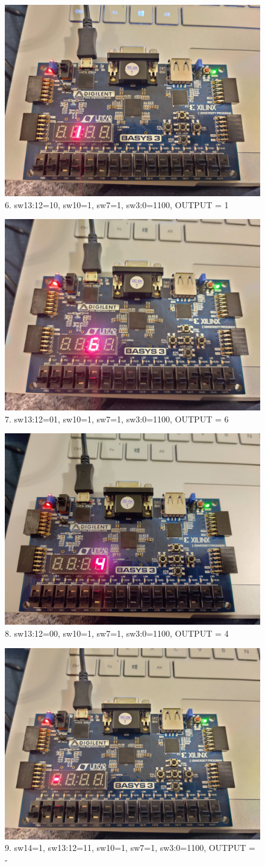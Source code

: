 \documentclass[11pt]{article}
\begin{document}
\begin{figure}[ht]\centering
	\includegraphics[width=.5\textwidth]{board6}
	\caption{6. sw13:12=10, sw10=1, sw7=1, sw3:0=1100, OUTPUT = 1}
	\label{fig:b3_6}			
\end{figure}

\begin{figure}[ht]\centering
	\includegraphics[width=.5\textwidth]{board7}
	\caption{7. sw13:12=01, sw10=1, sw7=1, sw3:0=1100, OUTPUT = 6}
	\label{fig:b3_7}			
\end{figure}

\begin{figure}[ht]\centering
	\includegraphics[width=.5\textwidth]{board8}
	\caption{8. sw13:12=00, sw10=1, sw7=1, sw3:0=1100, OUTPUT = 4}
	\label{fig:b3_8}			
\end{figure}

\begin{figure}[ht]\centering
	\includegraphics[width=.5\textwidth]{board9}
	\caption{9. sw14=1, sw13:12=11, sw10=1, sw7=1, sw3:0=1100, OUTPUT = -}
	\label{fig:b3_9}			
\end{figure}
\end{document}
